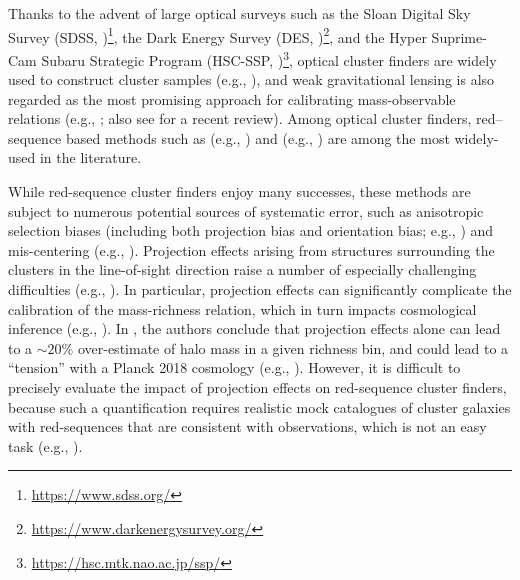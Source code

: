 \documentclass[fleqn,usenatbib,useAMS]{mnras}
\begin{document}
    Thanks to the advent of large optical surveys such as the Sloan Digital Sky Survey (SDSS,
    \citealt{York2000, SDSSDR7, SDSSDR16})\footnote{\url{https://www.sdss.org/}}, 
    the Dark Energy Survey (DES, \citealt{DES2016, Abbott2018,
    DES2021})\footnote{\url{https://www.darkenergysurvey.org/}}, and the Hyper Suprime-Cam Subaru
    Strategic Program (HSC-SSP, \citealt{Miyazaki2012, HSC-SSP, HSC-DR1,
    HSC-DR2})\footnote{\url{https://hsc.mtk.nao.ac.jp/ssp/}}, optical cluster finders
    are widely used to construct cluster samples (e.g., \citealt{Kepner1999,
    GladdersYee2000, Koester2007, Hao2010, Wen2012, Rykoff2014, Oguri2018, Aguena2021, Wen2021,
    Zou2021}), and weak gravitational lensing is also regarded
    as the most promising approach for calibrating mass-observable relations
    (e.g., \citealt{Leauthaud2010, Becker2011, vonderLinden2014, Applegate2014, 
    Applegate2016, Okabe2016, Grandis2019}; also see \citealt{Umetsu2020b} for a recent review).
    Among optical cluster finders, red--sequence based methods such as \redm{} (e.g.,
    \citealt{Rykoff2014, Rozo2014, Rozo2015a, Rozo2015b, Rykoff2016}) and \camira{} (e.g.,
    \citealt{Oguri2014, Oguri2018}) are among the most widely-used in the literature.

    While red-sequence cluster finders enjoy many successes, these methods are subject to numerous
    potential sources of systematic error, such as anisotropic selection biases (including both
    projection bias and orientation bias; e.g., \citealt{NohCohn2012, Dietrich2014, Osato2018,
    Herbonnet2019}) and mis-centering (e.g., \citealt{Saro2015, Zhang2019b}).
    Projection effects arising from structures surrounding the clusters in the line-of-sight
    direction raise a number of especially challenging difficulties (e.g., \citealt{Cohn2007,
    Erickson2011, Farahi2016, Zu2017, Busch2017, Costanzi2019, Sunayama2019, Sunayama2020}). 
    In particular, projection effects can significantly complicate the calibration of 
    the mass-richness relation, which in turn impacts cosmological inference 
    (e.g., \citealt{Erickson2011, Costanzi2019, Sunayama2020, Wu2021}).
    In \citet{DES2020}, the authors conclude that projection effects alone can lead to a $\sim 20$\%
    over-estimate of halo mass in a given richness bin, and could lead to a  ``tension'' with a
    Planck 2018 cosmology (e.g., \citealt{PLANCK2020}). 
    However, it is difficult to precisely evaluate the impact of projection effects on red-sequence
    cluster finders, because such a quantification requires realistic mock catalogues of cluster
    galaxies with red-sequences that are consistent with observations, which is not an easy task
    (e.g., \citealt{DeRose2019, Korytov2019}).
\end{document}
